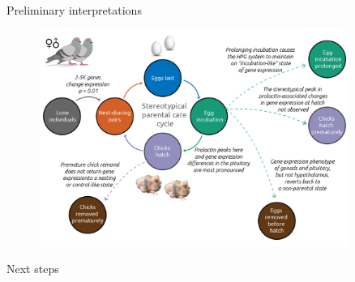 \documentclass[final]{beamer}
\newlength{\sepwid}
\newlength{\onecolwid}
\newlength{\twocolwid}
\begin{document}
\begin{frame}[t]
\begin{columns}[t]
\begin{column}{\twocolwid}
\begin{columns}[t,totalwidth=\twocolwid]
\begin{column}{\onecolwid}
\vspace{1em}



\end{column} %

\end{columns} %

\end{column} %

\begin{column}{\sepwid}\end{column} %

\begin{column}{\onecolwid} %


\vspace{-0.5em}

\begin{block}{Preliminary interpretations}

\begin{figure}
\includegraphics[width=1\linewidth]{DoveParentsRNAseq_summary.png}
\end{figure}

\end{block}

\begin{block}{Next steps}


\end{block}
\end{column}
\end{columns}
\end{frame}
\end{document}
